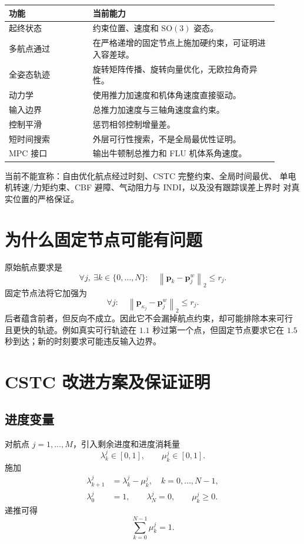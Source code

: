 \documentclass[UTF8,a4paper,11pt]{ctexart}
\newcommand{\SOthree}{\mathrm{SO}(3)}
\newcommand{\nTwo}[1]{\left\lVert#1\right\rVert_2}
\begin{document}
\begin{longtable}{p{0.29\linewidth}p{0.62\linewidth}}
\toprule
功能 & 当前能力\\
\midrule\endhead
起终状态 & 约束位置、速度和 $\SOthree$ 姿态。\\
多航点通过 & 在严格递增的固定节点上施加硬约束，可证明进入容差球。\\
全姿态轨迹 & 旋转矩阵传播、旋转向量优化，无欧拉角奇异性。\\
动力学 & 使用推力加速度和机体角速度直接驱动。\\
输入边界 & 总推力加速度与三轴角速度盒约束。\\
控制平滑 & 惩罚相邻控制增量差。\\
短时间搜索 & 外层可行性搜索，不是全局最优性证明。\\
MPC 接口 & 输出牛顿制总推力和 FLU 机体系角速度。\\
\bottomrule
\end{longtable}

当前不能宣称：自由优化航点经过时刻、CSTC 完整约束、全局时间最优、
单电机转速/力矩约束、CBF 避障、气动阻力与 INDI，以及没有跟踪误差上界时
对真实位置的严格保证。

\section{为什么固定节点可能有问题}

原始航点要求是
\begin{equation}
 \forall j,\ \exists k\in\{0,\ldots,N\}:\quad
 \nTwo{\bm p_k-\bm p_j^w}\leq r_j.
 \label{eq:exists}
\end{equation}
固定节点法将它加强为
\[
 \forall j:\quad\nTwo{\bm p_{\kappa_j}-\bm p_j^w}\leq r_j.
\]
后者蕴含前者，但反向不成立。因此它不会漏掉航点约束，却可能排除本来可行
且更快的轨迹。例如真实可行轨迹在 $1.1$ 秒过第一个点，但固定节点要求它在
$1.5$ 秒到达；新的时刻要求可能违反输入边界。

\section{CSTC 改进方案及保证证明}

\subsection{进度变量}

对航点 $j=1,\ldots,M$，引入剩余进度和进度消耗量
\[
 \lambda_k^j\in[0,1],\qquad\mu_k^j\in[0,1].
\]
施加
\begin{align}
 \lambda_{k+1}^j&=\lambda_k^j-\mu_k^j,\quad k=0,\ldots,N-1,
 \label{eq:progress}\\
 \lambda_0^j&=1,\qquad\lambda_N^j=0,\qquad\mu_k^j\geq0.
\end{align}
递推可得
\begin{equation}
 \sum_{k=0}^{N-1}\mu_k^j=1.
 \label{eq:sum-mu}
\end{equation}
\end{document}
